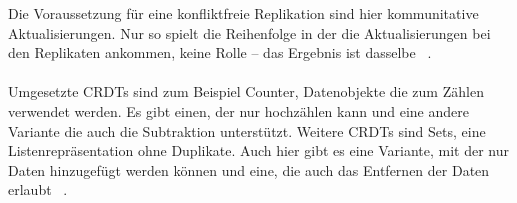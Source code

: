 Die Voraussetzung für eine konfliktfreie Replikation sind hier kommunitative Aktualisierungen.
Nur so spielt die Reihenfolge in der die Aktualisierungen bei den Replikaten ankommen, keine Rolle -- das Ergebnis ist dasselbe ~\cite{crdt_shapiro2}.\\\\
%
%
Umgesetzte \glspl{CRDT} sind zum Beispiel Counter, Datenobjekte die zum Zählen verwendet werden. Es gibt einen, der nur hochzählen kann und eine andere Variante die auch die Subtraktion unterstützt.
Weitere \glspl{CRDT} sind Sets, eine Listenrepräsentation ohne Duplikate. Auch hier gibt es eine Variante, mit der nur Daten hinzugefügt werden können und eine, die auch das Entfernen der Daten erlaubt ~\cite{crdt_shapiro}.
%
%

